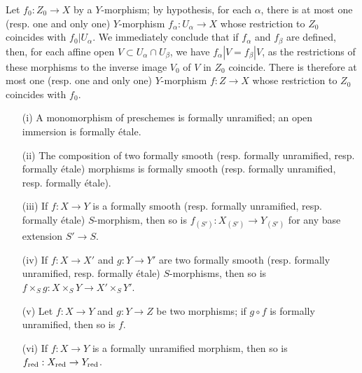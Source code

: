 \begin{remark}[17.1.2]
\begin{enumerate}
Let $f_0:Z_0\to X$ by a $Y$-morphism;
by hypothesis, for each $\alpha$, there is at most one (resp. one and only one) $Y$-morphism $f_\alpha:U_\alpha\to X$ whose restriction to $Z_0$ coincides with $f_0|U_\alpha$.
We immediately conclude that if $f_\alpha$ and $f_\beta$ are defined, then, for each affine open $V\subset U_\alpha\cap U_\beta$, we have $f_\alpha|V=f_\beta|V$, as the restrictions of these morphisms to the inverse image $V_0$ of $V$ in $Z_0$ coincide.
There is therefore at most one (resp. one and only one) $Y$-morphism $f:Z\to X$ whose restriction to $Z_0$ coincides with $f_0$.
\end{enumerate}
\end{remark}

\begin{proposition}[17.1.3]
\label{IV.17.1.3}
\medskip\noindent
\begin{enumerate}
  \item[{\rm(i)}] A monomorphism of preschemes is formally unramified;
    an open immersion is formally \'etale.
  \item[{\rm(ii)}] The composition of two formally smooth (resp. formally unramified, resp. formally \'etale) morphisms is formally smooth (resp. formally unramified, resp. formally \'etale).
  \item[{\rm(iii)}] If $f:X\to Y$ is a formally smooth (resp. formally unramified, resp. formally \'etale) $S$-morphism, then so is $f_{(S')}:X_{(S')}\to Y_{(S')}$ for any base extension $S'\to S$.
  \item[{\rm(iv)}] If $f:X\to X'$ and $g:Y\to Y'$ are two formally smooth (resp. formally unramified, resp. formally \'etale) $S$-morphisms, then so is $f\times_S g:X\times_S Y\to X'\times_S Y'$.
  \item[{\rm(v)}] Let $f:X\to Y$ and $g:Y\to Z$ be two morphisms;
  if $g\circ f$ is formally unramified, then so is $f$.
  \item[{\rm(vi)}] If $f:X\to Y$ is a formally unramified morphism, then so is $f_\red:X_\red\to Y_\red$.
\end{enumerate}
\end{proposition}

